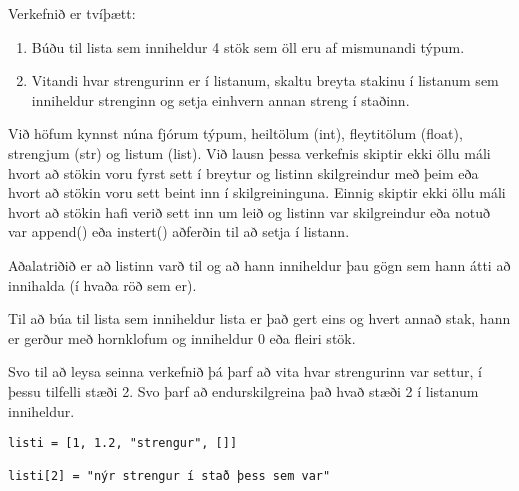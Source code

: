 \begin{exercise}\label{lst2}
		Verkefnið er tvíþætt:
\begin{enumerate}

	\item Búðu til lista sem inniheldur 4 stök sem öll eru af mismunandi týpum.
	\item Vitandi hvar strengurinn er í listanum, skaltu breyta stakinu í listanum sem inniheldur strenginn og setja einhvern annan streng í staðinn.
\end{enumerate}
\end{exercise}
\begin{Answer}[ref={lst2}]
Við höfum kynnst núna fjórum týpum, heiltölum (int), fleytitölum (float), strengjum (str) og listum (list).
Við lausn þessa verkefnis skiptir ekki öllu máli hvort að stökin voru fyrst sett í breytur og listinn skilgreindur með þeim eða hvort að stökin voru sett beint inn í skilgreininguna.
Einnig skiptir ekki öllu máli hvort að stökin hafi verið sett inn um leið og listinn var skilgreindur eða notuð var append() eða instert() aðferðin til að setja í listann.

Aðalatriðið er að listinn varð til og að hann inniheldur þau gögn sem hann átti að innihalda (í hvaða röð sem er).

Til að búa til lista sem inniheldur lista er það gert eins og hvert annað stak, hann er gerður með hornklofum og inniheldur 0 eða fleiri stök.

Svo til að leysa seinna verkefnið þá þarf að vita hvar strengurinn var settur, í þessu tilfelli stæði 2.
Svo þarf að endurskilgreina það hvað stæði 2 í listanum inniheldur. 
\begin{lstlisting}
listi = [1, 1.2, "strengur", []]

listi[2] = "nýr strengur í stað þess sem var"\end{lstlisting}
\end{Answer}

